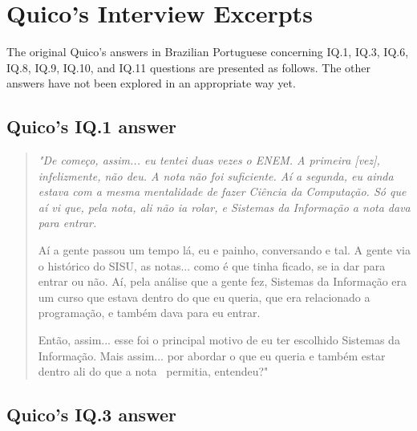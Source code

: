 \section{Quico’s Interview Excerpts}
\label{interview-exc-sec:quico}

The original Quico's answers in Brazilian Portuguese concerning 
 \gls{IQ}.1, 
 \gls{IQ}.3, 
\gls{IQ}.6, 
\gls{IQ}.8, 
\gls{IQ}.9, 
\gls{IQ}.10, and 
\gls{IQ}.11  
questions are presented as follows. The other answers have not been explored in an appropriate way yet.


 \subsection{Quico’s IQ.1 answer}
 \label{interview-exc-ss:quico-iq1}

 \begin{quote}
     \itshape
     "De começo, assim... eu tentei duas vezes o ENEM. A primeira [vez], infelizmente, não deu. A nota não foi suficiente. Aí a segunda, eu ainda estava com a mesma mentalidade de fazer Ciência da Computação. Só que aí vi que, pela nota, ali não ia rolar, e Sistemas da Informação a nota dava para entrar. 

    Aí a gente passou um tempo lá, eu e painho, conversando e tal. A gente via o histórico do SISU, as notas... como é que tinha ficado, se ia dar para entrar ou não. Aí, pela análise que a gente fez, Sistemas da Informação era um curso que estava dentro do que eu queria, que era relacionado a programação, e também dava para eu entrar.

    Então, assim... esse foi o principal motivo de eu ter escolhido Sistemas da Informação. Mais assim... por abordar o que eu queria e também estar dentro ali do que a nota  permitia, entendeu?"
 \end{quote}


\subsection{Quico’s IQ.3 answer}
\label{interview-exc-ss:quico-iq3}

